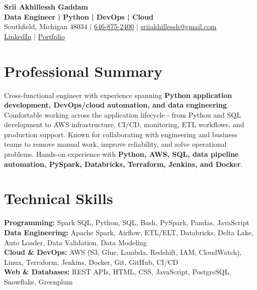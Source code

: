 \documentclass[letterpaper,10pt]{article}
\begin{document}
\fontsize{9.35pt}{10.45pt}\selectfont

\begin{center}
    {\LARGE \textbf{Srii Akhillessh Gaddam}} \\[-1pt]
    \textbf{Data Engineer | Python | DevOps | Cloud} \\[2pt]
    Southfield, Michigan 48034 $|$
    \href{tel:6468752400}{646-875-2400} $|$
    \href{mailto:sriiakhillessh@gmail.com}{sriiakhillessh@gmail.com} \\[1pt]
    \href{https://www.linkedin.com/in/srii-akhiilessh-gaddam-b48668191/}{LinkedIn} $|$
    \href{https://sriiakhillesshg.github.io/portfolio/}{Portfolio}
\end{center}
\vspace{-8pt}

\section{Professional Summary}
\small{Cross-functional engineer with experience spanning \textbf{Python application development, DevOps/cloud automation, and data engineering}. Comfortable working across the application lifecycle - from Python and SQL development to AWS infrastructure, CI/CD, monitoring, ETL workflows, and production support. Known for collaborating with engineering and business teams to remove manual work, improve reliability, and solve operational problems. Hands-on experience with \textbf{Python, AWS, SQL, data pipeline automation, PySpark, Databricks, Terraform, Jenkins, and Docker}.}

\section{Technical Skills}
\small{
\textbf{Programming:} Spark SQL, Python, SQL, Bash, PySpark, Pandas, JavaScript \\
\textbf{Data Engineering:} Apache Spark, Airflow, ETL/ELT, Databricks, Delta Lake, Auto Loader, Data Validation, Data Modeling \\
\textbf{Cloud \& DevOps:} AWS (S3, Glue, Lambda, Redshift, IAM, CloudWatch), Linux, Terraform, Jenkins, Docker, Git, GitHub, CI/CD \\
\textbf{Web \& Databases:} REST APIs, HTML, CSS, JavaScript, PostgreSQL, Snowflake, Greenplum
}

\end{document}
